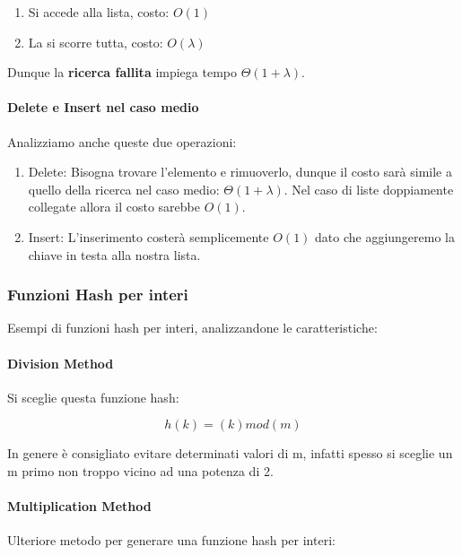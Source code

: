 \documentclass{article}
\begin{document}
\begin{enumerate}
    \item Si accede alla lista, costo: $O(1)$
    \item La si scorre tutta, costo: $O(\lambda)$
\end{enumerate}

Dunque la \textbf{ricerca fallita} impiega tempo $\Theta(1+\lambda)$.

\newpage

\paragraph{Delete e Insert nel caso medio} Analizziamo anche queste due operazioni:

\begin{enumerate}
    \item Delete: Bisogna trovare l'elemento e rimuoverlo, dunque il costo sarà simile a quello della ricerca nel caso medio: $\Theta(1+\lambda)$. Nel caso di liste doppiamente collegate allora il costo sarebbe $O(1)$.
    \item Insert: L'inserimento costerà semplicemente $O(1)$ dato che aggiungeremo la chiave in testa alla nostra lista.
\end{enumerate}

\subsubsection{Funzioni Hash per interi}

Esempi di funzioni hash per interi, analizzandone le caratteristiche:

\paragraph{Division Method} Si sceglie questa funzione hash:

\begin{equation}
    h(k) = (k) mod (m)
\end{equation}

In genere è consigliato evitare determinati valori di m, infatti spesso si sceglie un m primo non troppo vicino ad una potenza di 2.

\paragraph{Multiplication Method} Ulteriore metodo per generare una funzione hash per interi:
\end{document}
